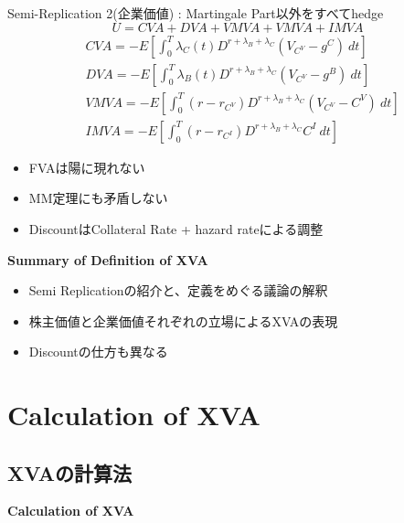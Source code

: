 \documentclass[driverfallback=dvipdfmx,cjk]{beamer}
\begin{document}
\begin{frame}
    Semi-Replication 2(企業価値) : Martingale Part以外をすべてhedge
   $$ U = CVA + DVA + VMVA + VMVA + IMVA$$
   \begin{align*}
    &CVA = -E[\int_0^T \lambda_C(t) D^{r + \lambda_B + \lambda_C}(V_{C^V}-g^C) \ dt]\\
    &DVA = -E[\int_0^T \lambda_B(t) D^{r + \lambda_B + \lambda_C}(V_{C^V}-g^B) \ dt]\\
    &VMVA = -E[\int_0^T (r - r_{C^V}) D^{r + \lambda_B + \lambda_C}(V_{C^V}-C^V) \ dt]\\
    &IMVA = -E[\int_0^T (r - r_{C^I}) D^{r + \lambda_B + \lambda_C} C^I \  dt]
   \end{align*}
   \begin{itemize}
       \item FVAは陽に現れない
       \item MM定理にも矛盾しない
       \item DiscountはCollateral Rate + hazard rateによる調整
   \end{itemize}
\end{frame}

\begin{frame}
\textbf{Summary of Definition of XVA}
\begin{itemize}
    \item Semi Replicationの紹介と、定義をめぐる議論の解釈
    \item 株主価値と企業価値それぞれの立場によるXVAの表現
    \item Discountの仕方も異なる
\end{itemize}
\end{frame}

\section{Calculation of XVA} 
\subsection{XVAの計算法}
\begin{frame}
   \textbf{Calculation of XVA} 
\end{frame}
\end{document}
